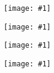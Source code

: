 \documentclass{article}
\newcommand{\img}[2]{
  \begin{center}
  \texttt{[image: \#1]}\\\vspace{2em}
  \end{center}
}
\begin{document}
  \img{10.png}{0.25}
  \vfill
  \img{52.png}{0.55}
  \img{14.png}{0.45}
  \vfill
  \img{77.png}{0.35}
\end{document}
